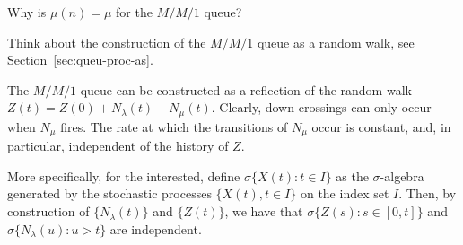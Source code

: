 \begin{exercise}
  Why is $\mu(n) = \mu$ for the $M/M/1$ queue?  
  \begin{hint}
Think about the
    construction of the $M/M/1$ queue as a random walk, see
    Section~\ref{sec:queu-proc-as}.
  \end{hint}
 \begin{solution}
   The $M/M/1$-queue can be constructed as a reflection of the random
   walk $Z(t) = Z(0) + N_\lambda(t) - N_\mu(t)$. Clearly,
   down crossings can only occur when $N_\mu$ fires. The rate at which
   the transitions of $N_\mu$ occur is constant, and, in particular,
   independent of the history of $Z$. 

   More specifically, for the interested, define
   $\sigma\{X(t) : t\in I\}$ as the $\sigma$-algebra generated by the
   stochastic processes $\{X(t), t\in I\}$ on the index set $I$. Then,
   by construction of $\{N_\lambda(t)\}$ and $\{Z(t)\}$, we have that
   $\sigma\{Z(s) : s\in[0,t]\}$  and $\sigma\{N_\lambda(u) : u > t\}$ are independent.
 \end{solution}
\end{exercise}


